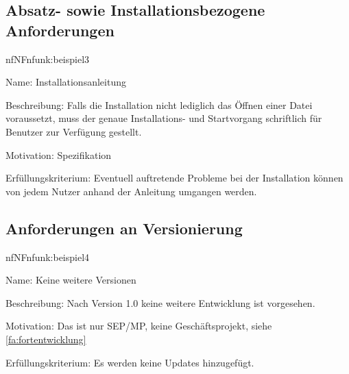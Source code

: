 %

\subsection{Absatz- sowie Installationsbezogene Anforderungen}

\begin{description}[leftmargin=5em, style=sameline]	
	\begin{lhp}{nf}{NF}{nfunk:beispiel3}
		\item [Name:] Installationsanleitung	
		\item [Beschreibung:] Falls die Installation nicht lediglich das Öffnen einer Datei voraussetzt, muss der genaue Installations- und Startvorgang schriftlich für Benutzer zur Verfügung gestellt.
		\item [Motivation:] Spezifikation
		\item [Erfüllungskriterium:] Eventuell auftretende Probleme bei der Installation können von jedem Nutzer anhand der Anleitung umgangen werden.
	\end{lhp}
\end{description}

\subsection{Anforderungen an Versionierung}

\begin{description}[leftmargin=5em, style=sameline]	
	\begin{lhp}{nf}{NF}{nfunk:beispiel4}
		\item [Name:] Keine weitere Versionen
		\item [Beschreibung:] Nach Version 1.0 keine weitere Entwicklung ist vorgesehen.
		\item [Motivation:] Das ist nur SEP/MP, keine Geschäftsprojekt, siehe \ref{fa:fortentwicklung}
		\item [Erfüllungskriterium:] Es werden keine Updates hinzugefügt.
	\end{lhp}
\end{description}

